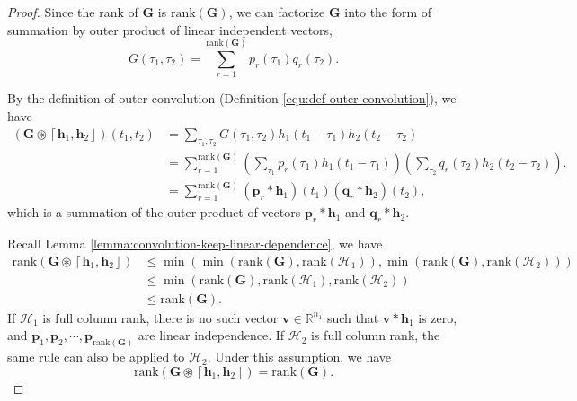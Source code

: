 \documentclass[twoside,11pt]{article}
\def\oconv{\circledast}
\def\rank{\text{rank}}
\def\tvar#1{\mathbf{#1}} %
\def\lcerfl#1{\left\lceil{#1}\right\rfloor}
\begin{document}
\begin{proof}
  Since the rank of \(\tvar{G}\) is \(\rank(\tvar{G})\), we can factorize \(\tvar{G}\) into the form of summation by outer product of linear independent vectors,
    \begin{equation*}
      G(\tau_1, \tau_2) = \sum_{r=1}^{\rank(\tvar{G})} p_r(\tau_1) q_r(\tau_2).
    \end{equation*}
  

  By the definition of outer convolution (Definition \ref{equ:def-outer-convolution}), we have
    \begin{equation*}
      \begin{aligned}
        (\tvar{G} \oconv \lcerfl{\tvar{h}_1, \tvar{h}_2})(t_1, t_2)
         & = \sum_{\tau_1, \tau_2} G(\tau_1, \tau_2) h_1(t_1 - \tau_1) h_2(t_2 - \tau_2)                                                                     \\
         & = \sum_{r=1}^{\rank(\tvar{G})} \left(\sum_{\tau_1} p_r(\tau_1) h_1(t_1 - \tau_1)\right) \left(\sum_{\tau_2} q_r(\tau_2) h_2(t_2 - \tau_2)\right). \\
         & = \sum_{r=1}^{\rank(\tvar{G})} (\tvar{p}_r * \tvar{h}_1)(t_1) (\tvar{q}_r * \tvar{h}_2)(t_2),
      \end{aligned}
    \end{equation*}
    which is a summation of the outer product of vectors \(\tvar{p}_r * \tvar{h}_1\) and \(\tvar{q}_r * \tvar{h}_2\).
  

  
  Recall Lemma \ref{lemma:convolution-keep-linear-dependence}, we have
  \begin{equation*}
    \begin{aligned}
      \rank(\tvar{G} \oconv \lcerfl{\tvar{h}_1, \tvar{h}_2})
       & \le \min\left(\min(\rank(\tvar{G}), \rank(\mathcal{H}_1)), \min(\rank(\tvar{G}), \rank(\mathcal{H}_2)) \right) \\
       & \le \min\left(\rank(\tvar{G}), \rank(\mathcal{H}_1), \rank(\mathcal{H}_2)\right)                               \\
       & \le \rank(\tvar{G}).
    \end{aligned}
  \end{equation*}
  If \(\mathcal{H}_1\) is full column rank, there is no such vector \(\tvar{v} \in \mathbb{R}^{n_1}\) such that \(\tvar{v} * \tvar{h}_1\) is zero, and \(\tvar{p}_1, \tvar{p}_2, \cdots, \tvar{p}_{\rank(\tvar{G})}\) are linear independence. If \(\mathcal{H}_2\) is full column rank, the same rule can also be applied to \(\mathcal{H}_2\). Under this assumption, we have
  \begin{equation*}
    \rank(\tvar{G} \oconv \lcerfl{\tvar{h}_1, \tvar{h}_2})
    = \rank(\tvar{G}).
  \end{equation*}
  
\end{proof}
\end{document}

